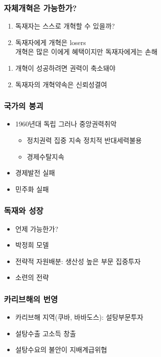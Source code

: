 \documentclass[xcolor=pdftex,dvipsnames]{beamer}
\renewcommand{\(}{\left(}
\renewcommand{\)}{\right)}
\begin{document}
\begin{frame}
\frametitle{자체개혁은 가능한가?} 
\begin{enumerate}
\item 독재자는 스스로 개혁할 수 있을까? 
\item 독재자에게 개혁은 losers\\ \pause
개혁은 많은 이에게 혜택이지만 독재자에게는 손해 \pause
\end{enumerate}
\begin{enumerate}
\item 개혁이 성공하려면 권력이 축소돼야
\item 독재자의 개혁약속은 신뢰성결여
\end{enumerate}

\end{frame}

\begin{frame}
\frametitle{국가의 붕괴} 
\begin{itemize}
\item  1960년대 독립 그러나 중앙권력취악 \pause
\begin{itemize}
\item 정치권력 집중 지속 
정치적 반대세력불용
\item 경제수탈지속 \pause
\end{itemize}
\item 경제발전 실패
\item 민주화 실패
\end{itemize}
\end{frame}

\begin{frame}
\frametitle{독재와 성장} 
\begin{itemize}
\item 언제 가능한가? 
\item 박정희 모델 \\
\item 전략적 자원배분: 생산성 높은 부문 집중투자\\
\item 소련의 전략
\end{itemize}
\end{frame}

\begin{frame}
\frametitle{카리브해의 번영} 
\begin{itemize}
\item 카리브해 지역(쿠바, 바바도스): 설탕부문투자
\item 설탕수출 고소득 창출
\item 설탕수요의 불안이 지배계급위협
\end{itemize}
\end{frame}
\end{document}
